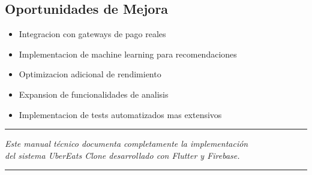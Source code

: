 \documentclass[12pt,a4paper]{article}
\begin{document}
\subsection{Oportunidades de Mejora}
\begin{itemize}[itemsep=0.5em]
    \item Integracion con gateways de pago reales
    \item Implementacion de machine learning para recomendaciones
    \item Optimizacion adicional de rendimiento
    \item Expansion de funcionalidades de analisis
    \item Implementacion de tests automatizados mas extensivos
\end{itemize}

\vspace{2cm}

\begin{center}
\textcolor{primaryblue}{\rule{12cm}{0.5pt}}
\vspace{0.5cm}

\textit{Este manual técnico documenta completamente la implementación\\
del sistema UberEats Clone desarrollado con Flutter y Firebase.}

\vspace{0.5cm}
\textcolor{primaryblue}{\rule{12cm}{0.5pt}}
\end{center}
\end{document}
